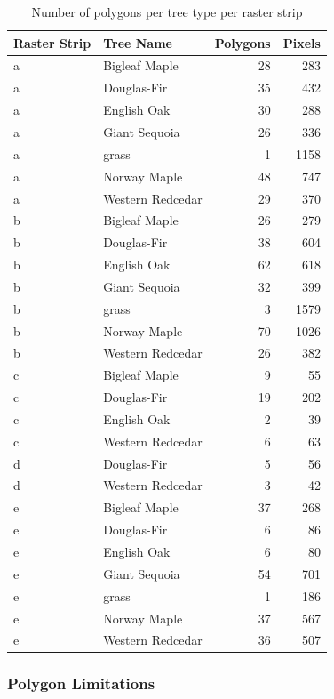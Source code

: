 \documentclass[12pt,twoside]{reedthesis}
\begin{document}
\begin{table}

\caption{\label{tab:polyCountsTrees}Number of polygons per tree type per raster strip}
\centering
\begin{tabular}[t]{l|l|r|r}
\hline
Raster Strip & Tree Name & Polygons & Pixels\\
\hline
a & Bigleaf Maple & 28 & 283\\
\hline
a & Douglas-Fir & 35 & 432\\
\hline
a & English Oak & 30 & 288\\
\hline
a & Giant Sequoia & 26 & 336\\
\hline
a & grass & 1 & 1158\\
\hline
a & Norway Maple & 48 & 747\\
\hline
a & Western Redcedar & 29 & 370\\
\hline
b & Bigleaf Maple & 26 & 279\\
\hline
b & Douglas-Fir & 38 & 604\\
\hline
b & English Oak & 62 & 618\\
\hline
b & Giant Sequoia & 32 & 399\\
\hline
b & grass & 3 & 1579\\
\hline
b & Norway Maple & 70 & 1026\\
\hline
b & Western Redcedar & 26 & 382\\
\hline
c & Bigleaf Maple & 9 & 55\\
\hline
c & Douglas-Fir & 19 & 202\\
\hline
c & English Oak & 2 & 39\\
\hline
c & Western Redcedar & 6 & 63\\
\hline
d & Douglas-Fir & 5 & 56\\
\hline
d & Western Redcedar & 3 & 42\\
\hline
e & Bigleaf Maple & 37 & 268\\
\hline
e & Douglas-Fir & 6 & 86\\
\hline
e & English Oak & 6 & 80\\
\hline
e & Giant Sequoia & 54 & 701\\
\hline
e & grass & 1 & 186\\
\hline
e & Norway Maple & 37 & 567\\
\hline
e & Western Redcedar & 36 & 507\\
\hline
\end{tabular}
\end{table}
\hypertarget{polygon-limitations}{%
\subsubsection{Polygon Limitations}\label{polygon-limitations}}
\end{document}
